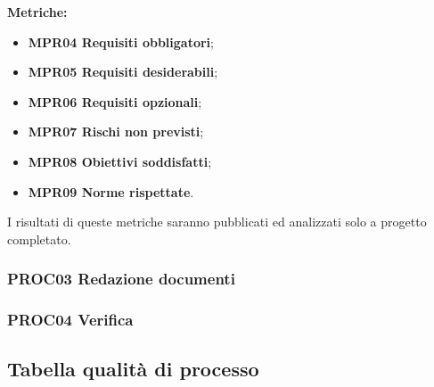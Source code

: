 \documentclass[../piano_di_qualifica.tex]{subfiles}
\begin{document}
\textbf{Metriche:}
\begin{itemize}
	\item \textbf{MPR04 Requisiti obbligatori};
	\item \textbf{MPR05 Requisiti desiderabili};
	\item \textbf{MPR06 Requisiti opzionali};
	\item \textbf{MPR07 Rischi non previsti};
	\item \textbf{MPR08 Obiettivi soddisfatti};
	\item \textbf{MPR09 Norme rispettate}.
\end{itemize}

I risultati di queste metriche saranno pubblicati ed analizzati solo a progetto completato.

\subsubsection{PROC03 Redazione documenti}


\subsubsection{PROC04 Verifica}


\subsection{Tabella qualità di processo}

\end{document}
